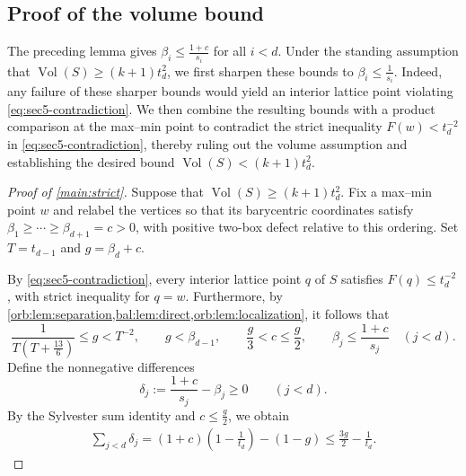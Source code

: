 \documentclass[reqno, 11pt]{article}
\numberwithin{equation}{section}
\theoremstyle{definition}
\begin{document}
\subsection{Proof of the volume bound}
The preceding lemma gives $\beta_i\le\frac{1+c}{s_i}$ for all $i<d$. Under the standing assumption that $\operatorname{Vol}(S)\ge(k+1)t_d^2$, we first sharpen these bounds to $\beta_i\le\frac{1}{s_i}$. Indeed, any failure of these sharper bounds would yield an interior lattice point violating \eqref{eq:sec5-contradiction}. We then combine the resulting bounds with a product comparison at the max--min point to contradict the strict inequality $F(w)<t_d^{-2}$ in \eqref{eq:sec5-contradiction}, thereby ruling out the volume assumption and establishing the desired bound $\operatorname{Vol}(S)<(k+1)t_d^2$.


\begin{proof}[Proof of \cref{main:strict}]
Suppose that $\operatorname{Vol}(S)\ge(k+1)t_d^2$. Fix a max--min point $w$ and relabel the vertices so that its barycentric coordinates satisfy $\beta_1\ge\cdots\ge\beta_{d+1}=c>0$,
with positive two-box defect relative to this ordering. Set $T=t_{d-1}$ and $g=\beta_d+c$. 

By \eqref{eq:sec5-contradiction}, every interior lattice point $q$ of $S$ satisfies $F(q)\le t_d^{-2}$, with strict inequality for $q=w$. Furthermore, by \cref{orb:lem:separation,bal:lem:direct,orb:lem:localization}, it follows that
\[
 \frac1{T(T+\frac{13}{6})}\le g<T^{-2},\qquad
 g<\beta_{d-1},\qquad \frac g3<c\le\frac g2,\qquad
 \beta_j\le\frac{1+c}{s_j}\quad(j<d).
\]
Define the nonnegative differences
\[
\delta_j:=\frac{1+c}{s_j}-\beta_j\ge0
\qquad(j<d).
\]
By the Sylvester sum identity and $c\le \frac{g}{2}$, we obtain
\begin{equation}\label{orb:eq:uniform-lower}
\begin{aligned}
\sum_{j<d}\delta_j=(1+c)\left(1-\frac1{t_d}\right)-(1-g)\le\frac{3g}{2}-\frac1{t_d}.
\end{aligned}
\end{equation}


\end{proof}
\end{document}
